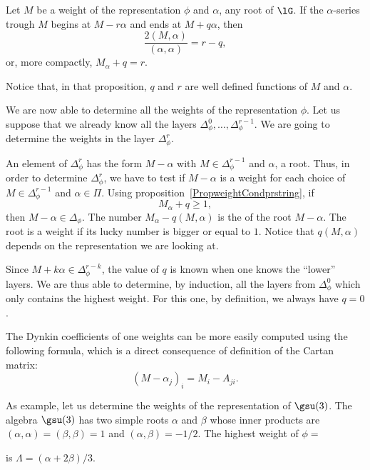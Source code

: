 \begin{proposition}     \label{PropweightCondprstring}
	Let $M$ be a weight of the representation $\phi$ and $\alpha$, any root of $\lG$. If the $\alpha$-series trough $M$ begins at $M-r\alpha$ and ends at $M+q\alpha$, then
	\begin{equation}
		\frac{ 2(M,\alpha) }{ (\alpha,\alpha) }=r-q,
	\end{equation}
	or, more compactly, $M_{\alpha}+q=r$.
\end{proposition}
Notice that, in that proposition, $q$ and $r$ are well defined functions of $M$ and $\alpha$.

We are now able to determine all the weights of the representation $\phi$. Let us suppose that we already know all the layers $\Delta_{\phi}^0,\ldots,\Delta_{\phi}^{r-1}$. We are going to determine the weights in the layer $\Delta_{\phi}^r$.

An element of $\Delta_{\phi}^r$ has the form $M-\alpha$ with $M\in\Delta_{\phi}^{r-1}$ and $\alpha$, a root. Thus, in order to determine $\Delta_{\phi}^r$, we have to test if $M-\alpha$ is a weight for each choice of $M\in\Delta_{\phi}^{r-1}$ and $\alpha\in\Pi$. Using proposition~\ref{PropweightCondprstring}, if
\begin{equation}
	M_{\alpha}+q \geq 1,
\end{equation}
then $M-\alpha\in\Delta_{\phi}$. The number $M_{\alpha}-q(M,\alpha)$ is the  of the root $M-\alpha$. The root is a weight if its lucky number is bigger or equal to $1$. Notice that $q(M,\alpha)$ depends on the representation we are looking at.

Since $M+k\alpha\in\Delta_{\phi}^{r-k}$, the value of $q$ is known when one knows the ``lower'' layers. We are thus able to determine, by induction, all the layers from $\Delta^0_{\phi}$ which only contains the highest weight. For this one, by definition, we always have $q=0$.

The Dynkin coefficients of one weights can be more easily computed using the following formula, which is a direct consequence of definition of the Cartan matrix:
\begin{equation}        \label{EqCoefDynkMalpha}
	(M-\alpha_j)_i=M_i-A_{ji}.
\end{equation}

As example, let us determine the weights of the representation  of \( \gsu(3)\).
%
The algebra $\gsu(3)$ has two simple roots $\alpha$ and $\beta$ whose inner products are $(\alpha,\alpha)=(\beta,\beta)=1$ and $(\alpha,\beta)=-1/2$. The highest weight of $\phi=$

is $\Lambda=(\alpha+2\beta)/3$.

